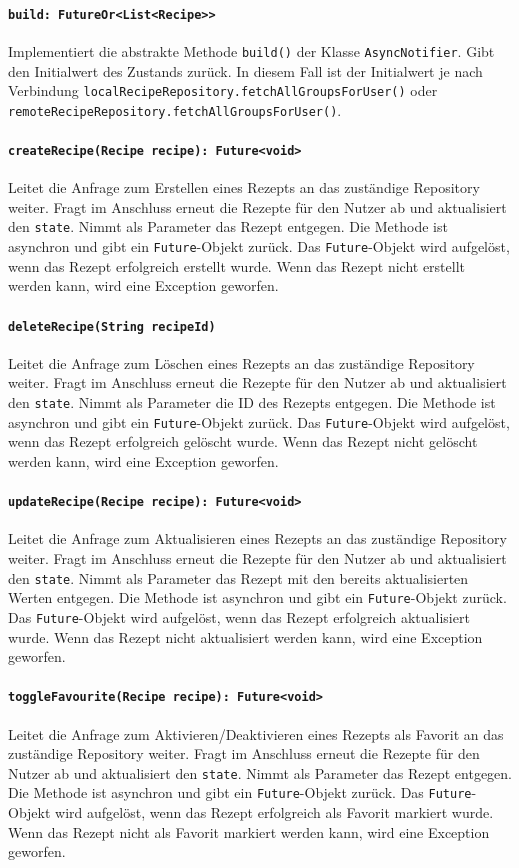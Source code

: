 \documentclass{entwurfsheft}
\begin{document}
\paragraph{\texttt{build: FutureOr<List<Recipe>>}}
Implementiert die abstrakte Methode \texttt{build()} der Klasse \texttt{AsyncNotifier}. Gibt den Initialwert des Zustands zurück. In diesem Fall ist der Initialwert je nach Verbindung \texttt{localRecipeRepository.fetchAllGroupsForUser()} oder \texttt{remoteRecipeRe\-pository.fetchAllGroupsForUser()}.
\paragraph{\texttt{createRecipe(Recipe recipe): Future<void>}}
Leitet die Anfrage zum Erstellen eines Rezepts an das zuständige Repository weiter. Fragt im Anschluss erneut die Rezepte für den Nutzer ab und aktualisiert den \texttt{state}. Nimmt als Parameter das Rezept entgegen. Die Methode ist asynchron und gibt ein \texttt{Future}-Objekt zurück. Das \texttt{Future}-Objekt wird aufgelöst, wenn das Rezept erfolgreich erstellt wurde. Wenn das Rezept nicht erstellt werden kann, wird eine Exception geworfen.
\paragraph{\texttt{deleteRecipe(String recipeId)}}
Leitet die Anfrage zum Löschen eines Rezepts an das zuständige Repository weiter. Fragt im Anschluss erneut die Rezepte für den Nutzer ab und aktualisiert den \texttt{state}. Nimmt als Parameter die ID des Rezepts entgegen. Die Methode ist asynchron und gibt ein \texttt{Future}-Objekt zurück. Das \texttt{Future}-Objekt wird aufgelöst, wenn das Rezept erfolgreich gelöscht wurde. Wenn das Rezept nicht gelöscht werden kann, wird eine Exception geworfen.
\paragraph{\texttt{updateRecipe(Recipe recipe): Future<void>}}
Leitet die Anfrage zum Aktualisieren eines Rezepts an das zuständige Repository weiter. Fragt im Anschluss erneut die Rezepte für den Nutzer ab und aktualisiert den \texttt{state}. Nimmt als Parameter das Rezept mit den bereits aktualisierten Werten entgegen. Die Methode ist asynchron und gibt ein \texttt{Future}-Objekt zurück. Das \texttt{Future}-Objekt wird aufgelöst, wenn das Rezept erfolgreich aktualisiert wurde. Wenn das Rezept nicht aktualisiert werden kann, wird eine Exception geworfen.
\paragraph{\texttt{toggleFavourite(Recipe recipe): Future<void>}}
Leitet die Anfrage zum Aktivieren/De\-aktivieren eines Rezepts als Favorit an das zuständige Repository weiter. Fragt im Anschluss erneut die Rezepte für den Nutzer ab und aktualisiert den \texttt{state}. Nimmt als Parameter das Rezept entgegen. Die Methode ist asynchron und gibt ein \texttt{Future}-Objekt zurück. Das \texttt{Future}-Objekt wird aufgelöst, wenn das Rezept erfolgreich als Favorit markiert wurde. Wenn das Rezept nicht als Favorit markiert werden kann, wird eine Exception geworfen.
\end{document}
